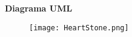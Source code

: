 \documentclass[letterpaper,11pt]{article}
\begin{document}
\lstset{language=Java} 


	\oddsidemargin 0cm \topmargin -2cm \textheight 21cm \textwidth
	16.5cm \headheight 1cm \linespread {1.0} \headsep 1cm \parindent 0mm

	












\center
\textbf{Diagrama UML}

\begin{figure}[H]
\center
\texttt{[image: HeartStone.png]}
\end{figure}

\end{document}
